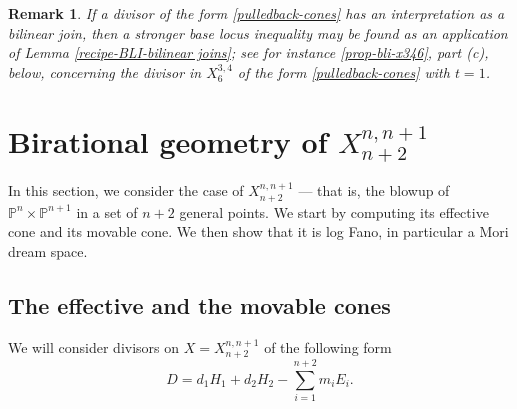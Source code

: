\documentclass[a4paper,11pt]{article}
\newtheorem{remark}[theorem]{Remark}
\newcommand{\PP}{\mathbb P}
\begin{document}
\begin{remark}
If a divisor of the form \eqref{pulledback-cones} has an interpretation as a bilinear join, then a stronger base locus inequality may be found as an application of Lemma \ref{recipe-BLI-bilinear joins}; see for instance 
\ref{prop-bli-x346}, part (c), below, concerning the divisor in $X^{3,4}_6$ of the form \eqref{pulledback-cones} with $t=1$.
\end{remark}





\section{Birational geometry of \texorpdfstring{$X^{n,n+1}_{n+2}$}{X{n,n+1}{n+2}}}\label{section-Xn,n,n+2}
In this section, we consider the case of $X^{n,n+1}_{n+2}$ --- that is, the blowup of $\PP^n \times \PP^{n+1}$ in a set of $n+2$ general points.  We start by computing its effective cone and its movable cone. We then show that it is log Fano, in particular a Mori dream space.

\subsection{The effective and the movable cones}
We will consider divisors  on $X=X^{n,n+1}_{n+2}$ of the following form
\begin{equation}\label{general-divisor-n+2}
D=d_1H_1+d_2H_2-\sum_{i=1}^{n+2}m_iE_i.
\end{equation}
\end{document}

